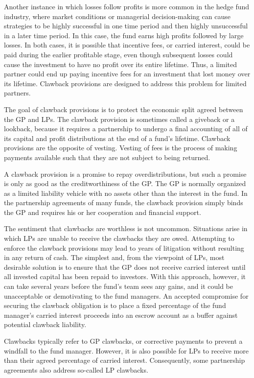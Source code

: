 \documentclass[11pt]{article}
\begin{document}
Another instance in which losses follow profits is more common in the hedge fund industry, where market conditions or managerial decision-making can cause strategies to be highly successful in one time period and then highly unsuccessful in a later time period. In this case, the fund earns high profits followed by large losses. In both cases, it is possible that incentive fees, or carried interest, could be paid during the earlier profitable stage, even though subsequent losses could cause the investment to have no profit over its entire lifetime. Thus, a limited partner could end up paying incentive fees for an investment that lost money over its lifetime. Clawback provisions are designed to address this problem for limited partners.

The goal of clawback provisions is to protect the economic split agreed between the GP and LPs. The clawback provision is sometimes called a giveback or a lookback, because it requires a partnership to undergo a final accounting of all of its capital and profit distributions at the end of a fund's lifetime. Clawback provisions are the opposite of vesting. Vesting of fees is the process of making payments available such that they are not subject to being returned.

A clawback provision is a promise to repay overdistributions, but such a promise is only as good as the creditworthiness of the GP. The GP is normally organized as a limited liability vehicle with no assets other than the interest in the fund. In the partnership agreements of many funds, the clawback provision simply binds the GP and requires his or her cooperation and financial support.

The sentiment that clawbacks are worthless is not uncommon. Situations arise in which LPs are unable to receive the clawbacks they are owed. Attempting to enforce the clawback provisions may lead to years of litigation without resulting in any return of cash. The simplest and, from the viewpoint of LPs, most desirable solution is to ensure that the GP does not receive carried interest until all invested capital has been repaid to investors. With this approach, however, it can take several years before the fund's team sees any gains, and it could be unacceptable or demotivating to the fund managers. An accepted compromise for securing the clawback obligation is to place a fixed percentage of the fund manager's carried interest proceeds into an escrow account as a buffer against potential clawback liability.

Clawbacks typically refer to GP clawbacks, or corrective payments to prevent a windfall to the fund manager. However, it is also possible for LPs to receive more than their agreed percentage of carried interest. Consequently, some partnership agreements also address so-called LP clawbacks.
\end{document}
